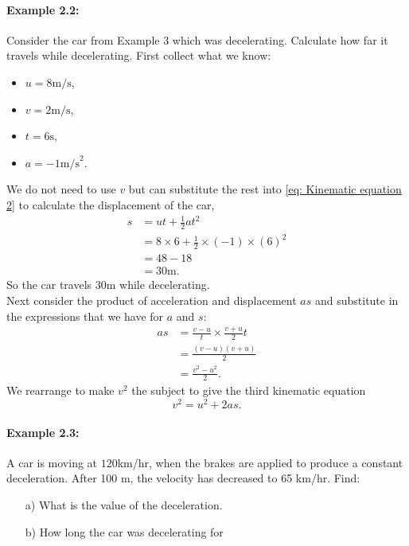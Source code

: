 \documentclass[a4paper,12pt]{book}
\begin{document}
\paragraph{Example 2.2:} Consider the car from Example 3 which was decelerating. Calculate how far it travels while decelerating. 
First collect what we know:
\begin{itemize}
\setlength{\itemsep}{-5pt}
    \item $u=8\text{m/s}$,
    \item $v=2\text{m/s}$,
    \item $t=6\text{s}$,
    \item $a=-1\text{m/s}^{2}$.
\end{itemize}
We do not need to use $v$ but can substitute the rest into \cref{eq: Kinematic equation 2} to calculate the displacement of the car,
\begin{align*}
    s&=ut+\frac{1}{2}at^{2}\\
     &=8\times 6 +\frac{1}{2}\times \left(-1\right)\times \left(6\right)^{2}\\
     &=48-18\\
     &=30\text{m}.
\end{align*}
So the car travels $30\text{m}$ while decelerating.\\

Next consider the product of acceleration and displacement $as$ and substitute in the expressions that we have for $a$ and $s$:
\begin{align*}
    as  &=\frac{v-u}{t}\times \frac{v+u}{2}t\\
        &=\frac{(v-u)(v+u)}{2}\\
        &=\frac{v^{2}-u^{2}}{2}.
\end{align*}
We rearrange to make $v^{2}$ the subject to give the third kinematic equation
\begin{equation}
    v^{2}=u^{2}+2as.
    \label{eq: Kinematic equation 3}
\end{equation}

\paragraph{Example 2.3:} A car is moving at $120 $km/hr, when the brakes are applied to produce a constant deceleration. After 100 m, the velocity has decreased to 65 km/hr. Find:
\begin{itemize}
\setlength{\itemsep}{-5pt}
    \item[a)] What is the value of the deceleration.
    \item[b)] How long the car was decelerating for
\end{itemize}
\end{document}
